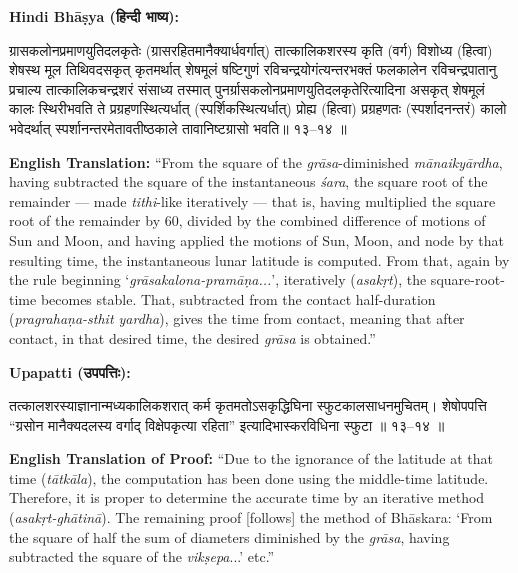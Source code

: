 \documentclass[11pt,a4paper]{article}
\newcommand{\dev}[1]{{\devanagarifont #1}}
\newenvironment{sanskritverse}{%
  \begin{center}\begin{minipage}{0.95\textwidth}
  \setlength{\leftskip}{1em}
  \setlength{\rightskip}{1em}
  \dev
}{\end{minipage}\end{center}}
\newenvironment{paracol}[1]{\begingroup}{\endgroup}
\newcommand{\switchcolumn}[1][]{%
  \ifnum#1=0\relax\else\par\nobreak\vspace{0.5em}\par\nobreak\fi%
}
\begin{document}
\begin{paracol}{2}

\noindent\textbf{Hindi Bhāṣya (\dev{हिन्दी भाष्य}):}
\begin{sanskritverse}
ग्रासकलोनप्रमाणयुतिदलकृतेः (ग्रासरहितमानैक्यार्धवर्गात्) तात्कालिकशरस्य कृति
(वर्ग) विशोध्य (हित्वा) शेषस्थ मूल तिथिवदसकृत् कृतमर्थात् शेषमूलं षष्टिगुणं
रविचन्द्रयोगंत्यन्तरभक्तं फलकालेन रविचन्द्रपातानु प्रचाल्य तात्कालिकचन्द्रशरं संसाध्य
तस्मात् पुनर्ग्रासकलोनप्रमाणयुतिदलकृतेरित्यादिना असकृत् शेषमूलं कालः स्थिरीभवति
ते प्रग्रहणस्थित्यर्धात् (स्पर्शिकस्थित्यर्धात्) प्रोह्य (हित्वा) प्रग्रहणतः (स्पर्शादनन्तरं)
कालो भवेदर्थात् स्पर्शानन्तरमेतावतीष्ठकाले तावानिष्टग्रासो भवति॥ १३--१४ ॥
\end{sanskritverse}

\switchcolumn

\textbf{English Translation:} ``From the square of the \textit{grāsa}-diminished \textit{mānaikyārdha}, having subtracted the square of the instantaneous \textit{śara}, the square root of the remainder --- made \textit{tithi}-like iteratively --- that is, having multiplied the square root of the remainder by 60, divided by the combined difference of motions of Sun and Moon, and having applied the motions of Sun, Moon, and node by that resulting time, the instantaneous lunar latitude is computed. From that, again by the rule beginning `\textit{grāsakalona-pramāṇa...}', iteratively (\textit{asakṛt}), the square-root-time becomes stable. That, subtracted from the contact half-duration (\textit{pragrahaṇa-sthit yardha}), gives the time from contact, meaning that after contact, in that desired time, the desired \textit{grāsa} is obtained.''

\end{paracol}

\vspace{0.5em}

\begin{paracol}{2}

\noindent\textbf{Upapatti (\dev{उपपत्तिः}):}
\begin{sanskritverse}
तत्कालशरस्याज्ञानान्मध्यकालिकशरात् कर्म कृतमतोऽसकृद्धिघिना स्फुटकालसाधनमुचितम्।
शेषोपपत्ति ``ग्रसोन मानैक्यदलस्य वर्गाद् विक्षेपकृत्या रहिता'' इत्यादिभास्करविधिना
स्फुटा ॥ १३--१४ ॥
\end{sanskritverse}

\switchcolumn

\textbf{English Translation of Proof:} ``Due to the ignorance of the latitude at that time (\textit{tātkāla}), the computation has been done using the middle-time latitude. Therefore, it is proper to determine the accurate time by an iterative method (\textit{asakṛt-ghātinā}). The remaining proof [follows] the method of Bhāskara: `From the square of half the sum of diameters diminished by the \textit{grāsa}, having subtracted the square of the \textit{vikṣepa}...' etc.''

\end{paracol}
\end{document}
